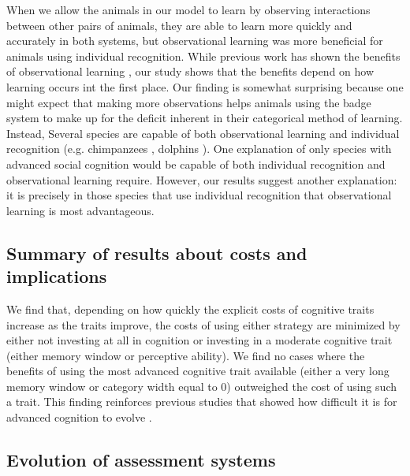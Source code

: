 When we allow the animals in our model to learn by observing interactions between other pairs of animals, they are able to learn more quickly and accurately in both systems, but observational learning was more beneficial for animals using individual recognition. While previous work has shown the benefits of observational learning \cite{Schaik:2011oq,Holekamp:1991nx,Freeman:1985kl}, our study shows that the benefits depend on how learning occurs int the first place. Our finding is somewhat surprising because one might expect that making more observations helps animals using the badge system to make up for the deficit inherent in their categorical method of learning. Instead, Several species are capable of both observational learning and individual recognition (e.g. chimpanzees \cite{Parr:2000hc,Hopper:2008bh}, dolphins \cite{Krutzen:2005ij,Sayigh:1999bs}). One explanation of only species with advanced social cognition would be capable of both individual recognition and observational learning require. However, our results suggest another explanation: it is precisely in those species that use individual recognition that observational learning is most advantageous.

\subsection*{Summary of results about costs and implications} %
We find that, depending on how quickly the explicit costs of cognitive traits increase as the traits improve, the costs of using either strategy are minimized by either not investing at all in cognition or investing in a moderate cognitive trait (either memory window or perceptive ability). We find no cases where the benefits of using the most advanced cognitive trait available (either a very long memory window or category width equal to $0$) outweighed the cost of using such a trait. This finding reinforces previous studies that showed how difficult it is for advanced cognition to evolve \cite{Kerr:2003vn}.



\subsection*{Evolution of assessment systems} %


